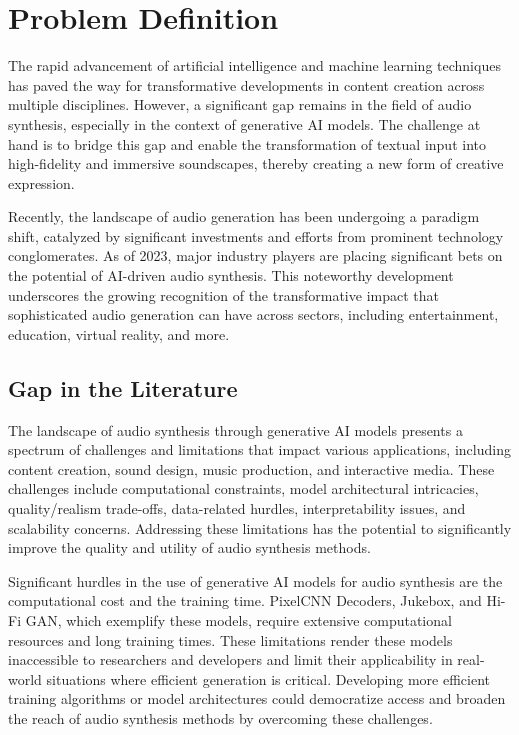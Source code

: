 \section{Problem Definition} \label{sec:problem-definition}

The rapid advancement of artificial intelligence and machine learning techniques has paved the way for transformative developments in content creation across multiple disciplines. However, a significant gap remains in the field of audio synthesis, especially in the context of generative \ac{AI} models. The challenge at hand is to bridge this gap and enable the transformation of textual input into high-fidelity and immersive soundscapes, thereby creating a new form of creative expression.

Recently, the landscape of audio generation has been undergoing a paradigm shift, catalyzed by significant investments and efforts from prominent technology conglomerates. As of 2023, major industry players are placing significant bets on the potential of \ac{AI}-driven audio synthesis. This noteworthy development underscores the growing recognition of the transformative impact that sophisticated audio generation can have across sectors, including entertainment, education, virtual reality, and more.

\subsection{Gap in the Literature}

The landscape of audio synthesis through generative \ac{AI} models presents a spectrum of challenges and limitations that impact various applications, including content creation, sound design, music production, and interactive media. These challenges include computational constraints, model architectural intricacies, quality/realism trade-offs, data-related hurdles, interpretability issues, and scalability concerns. Addressing these limitations has the potential to significantly improve the quality and utility of audio synthesis methods.

Significant hurdles in the use of generative \ac{AI} models for audio synthesis are the computational cost and the training time. PixelCNN Decoders, Jukebox, and Hi-Fi GAN, which exemplify these models, require extensive computational resources and long training times. These limitations render these models inaccessible to researchers and developers and limit their applicability in real-world situations where efficient generation is critical. Developing more efficient training algorithms or model architectures could democratize access and broaden the reach of audio synthesis methods by overcoming these challenges.

